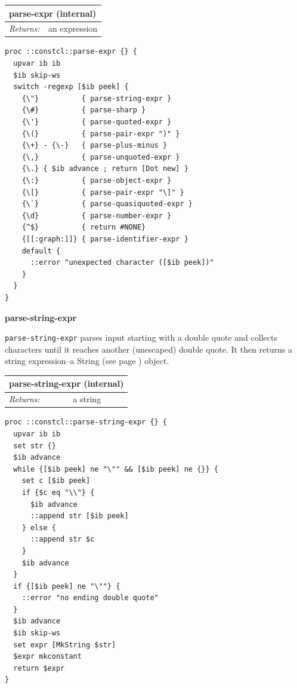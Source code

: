 \documentclass[twoside,9pt]{report}
\begin{document}
\begin{tabular}{ |l l| }
\hline
\multicolumn{2}{|l|}{parse-expr (internal)} \\
\hline
\textit{Returns:} & an expression \\
\hline
\end{tabular}

\noindent\makebox[\linewidth]{\rule{\linewidth}{0.4pt}}
\begin{lstlisting}
proc ::constcl::parse-expr {} {
  upvar ib ib
  $ib skip-ws
  switch -regexp [$ib peek] {
    {\"}          { parse-string-expr }
    {\#}          { parse-sharp }
    {\'}          { parse-quoted-expr }
    {\(}          { parse-pair-expr ")" }
    {\+} - {\-}   { parse-plus-minus }
    {\,}          { parse-unquoted-expr }
    {\.} { $ib advance ; return [Dot new] }
    {\:}          { parse-object-expr }
    {\[}          { parse-pair-expr "\]" }
    {\`}          { parse-quasiquoted-expr }
    {\d}          { parse-number-expr }
    {^$}          { return #NONE}
    {[[:graph:]]} { parse-identifier-expr }
    default {
      ::error "unexpected character ([$ib peek])"
    }
  }
}
\end{lstlisting}
\noindent\makebox[\linewidth]{\rule{\linewidth}{0.4pt}}

\textbf{parse-string-expr}


\texttt{parse-string-expr} parses input starting with a double quote and collects characters until it reaches another (unescaped) double quote. It then returns a string expression--a String (see page \pageref{strings}) object.

\begin{tabular}{ |l l| }
\hline
\multicolumn{2}{|l|}{parse-string-expr (internal)} \\
\hline
\textit{Returns:} & a string \\
\hline
\end{tabular}

\noindent\makebox[\linewidth]{\rule{\linewidth}{0.4pt}}
\begin{lstlisting}
proc ::constcl::parse-string-expr {} {
  upvar ib ib
  set str {}
  $ib advance
  while {[$ib peek] ne "\"" && [$ib peek] ne {}} {
    set c [$ib peek]
    if {$c eq "\\"} {
      $ib advance
      ::append str [$ib peek]
    } else {
      ::append str $c
    }
    $ib advance
  }
  if {[$ib peek] ne "\""} {
    ::error "no ending double quote"
  }
  $ib advance
  $ib skip-ws
  set expr [MkString $str]
  $expr mkconstant
  return $expr
}
\end{lstlisting}
\noindent\makebox[\linewidth]{\rule{\linewidth}{0.4pt}}
\end{document}
